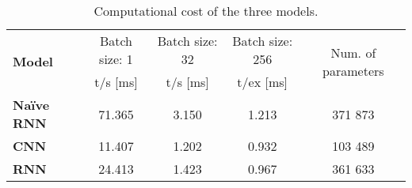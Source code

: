 \begin{table}[H]
	\centering
	\caption{Computational cost of the three models.}
    \begin{tabular}{l|c|c|c|c}
        \toprule
        \multirow{2}{*}{\textbf{Model}} & Batch size: 1 & Batch size: 32 & Batch size: 256 & \multirow{2}{*}{Num. of parameters} \\
                                        & t/s [ms]      & t/s [ms]       & t/ex [ms]       &                                     \\
        \midrule
        \textbf{Naïve RNN}             & 71.365        & 3.150          & 1.213           & 371 873                             \\
        \textbf{CNN  }                  & 11.407        & 1.202          & 0.932           & 103 489                             \\
        \textbf{RNN  }                  & 24.413        & 1.423          & 0.967           & 361 633                             \\
        \bottomrule
    \end{tabular}
	\label{tab:results_computational_footprint}
\end{table}